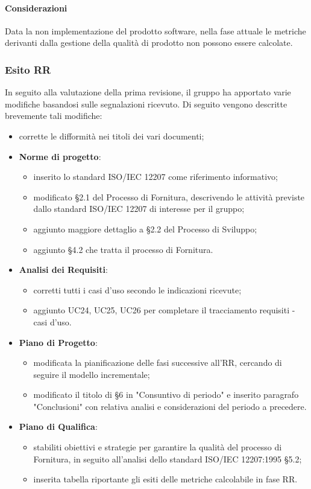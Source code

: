 	\paragraph{Considerazioni}
	Data la non implementazione del prodotto software, nella fase attuale le metriche derivanti dalla gestione della qualità di prodotto non possono essere calcolate.
\subsubsection{Esito RR}
	In seguito alla valutazione della prima revisione, il gruppo ha apportato varie modifiche basandosi sulle segnalazioni ricevuto. Di seguito vengono descritte brevemente tali modifiche:
	\begin{itemize}
		\item corrette le difformità nei titoli dei vari documenti;
		\item \textbf{Norme di progetto}: 
			\begin{itemize}	
				\item inserito lo standard ISO/IEC 12207 come riferimento informativo;
				\item modificato §2.1 del Processo di Fornitura, descrivendo le attività previste dallo standard ISO/IEC 12207 di interesse per il gruppo;
				\item aggiunto maggiore dettaglio a §2.2 del Processo di Sviluppo;
				\item aggiunto §4.2 che tratta il processo di Fornitura.
			\end{itemize}
		\item \textbf{Analisi dei Requisiti}: 
			\begin{itemize}
				\item corretti tutti i casi d'uso secondo le indicazioni ricevute;
				\item aggiunto UC24, UC25, UC26 per completare il tracciamento requisiti - casi d'uso.
			\end{itemize} 
		\item \textbf{Piano di Progetto}: 
			\begin{itemize}
				\item modificata la pianificazione delle fasi successive all'RR, cercando di seguire il modello incrementale;
				\item modificato il titolo di §6 in "Consuntivo di periodo" e inserito paragrafo "Conclusioni" con relativa analisi e considerazioni del periodo a precedere.
			\end{itemize}
		\item \textbf{Piano di Qualifica}: 
			\begin{itemize}
				\item stabiliti obiettivi e strategie per garantire la qualità del processo di Fornitura, in seguito all'analisi dello standard ISO/IEC 12207:1995 §5.2;
				\item inserita tabella riportante gli esiti delle metriche calcolabile in fase RR.
			\end{itemize}
	\end{itemize}

